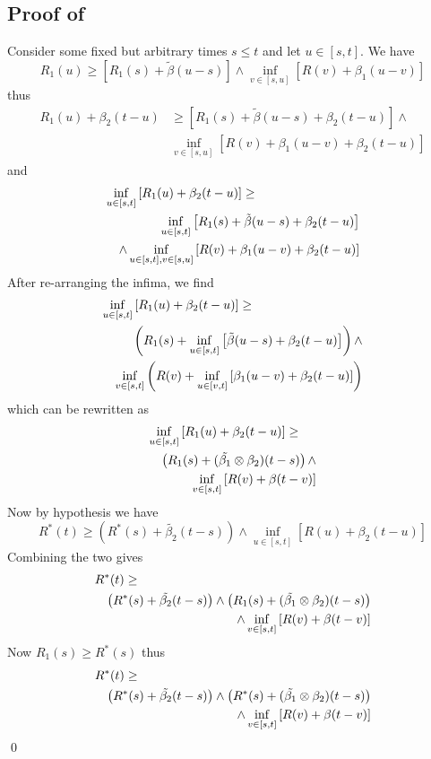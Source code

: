 \subsection{Proof of }
 Consider some fixed but arbitrary times $s\leq t$ and let $u
 \in [s,t]$. We have
 $$
 R_1(u) \geq \left[R_1(s) + \tilde{\beta}(u-s) \right]
 \wedge
 \inf_{v \in [s,u]} \left[ R(v) + \beta_1(u-v)\right]
 $$
 thus
 $$
  \begin{array}{rl}
   R_1(u)  + \beta_2(t-u) &\geq
    \left[R_1(s) + \tilde{\beta}(u-s)+\beta_2(t-u)
 \right]
 \wedge \\
 &\inf_{v \in [s,u]} \left[ R(v) + \beta_1(u-v)
 +\beta_2(t-u)\right]
  \end{array}
 $$
 and
 \begin{eqnarray*}
  \lefteqn{\inf_{u \in [s,t]} \left[R_1(u) + \beta_2(t-u)\right]
  \geq  } \\
  & & \inf_{u \in [s,t]}
 \left[R_1(s) + \tilde{\beta}(u-s)+\beta_2(t-u) \right]\\
  & &
 \wedge
 \inf_{u \in [s,t], v \in [s,u]}
 \left[ R(v) + \beta_1(u-v) +\beta_2(t-u)\right]
 \end{eqnarray*}
 After re-arranging the infima, we find
 \begin{eqnarray*}
  \lefteqn{
 \inf_{u \in [s,t]} \left[R_1(u) + \beta_2(t-u)\right]
 \geq } \\
 & &   \left(R_1(s) +
  \inf_{u \in [s,t]} \left[\tilde{\beta}(u-s)+\beta_2(t-u)
  \right]\right)
 \wedge \\
& & \inf_{v \in [s,t]}\left( R(v) + \inf_{u \in [v,t]} \left[
\beta_1(u-v) +\beta_2(t-u)\right]\right)
\end{eqnarray*}
which can be rewritten as
 \begin{eqnarray*}
  \lefteqn{\inf_{u \in [s,t]} \left[R_1(u) + \beta_2(t-u)\right]
  \geq}\\
 & &  \left( R_1(s) + (\tilde{\beta_1} \mpc \beta_2) (t-s)
 \right) \wedge\\
 & & \inf_{v \in [s,t]}\left[R(v) + \beta(t-v)\right]
\end{eqnarray*}
Now by hypothesis we have
$$
R^*(t) \geq \left( R^*(s) + \tilde{\beta_2}(t-s)\right) \wedge
\inf_{u \in [s,t]}[R(u)+\beta_2(t-u)]
$$
Combining the two gives
\begin{eqnarray*}
  \lefteqn{
R^*(t) \geq }\\
 & & \left( R^*(s) + \tilde{\beta_2}(t-s)\right) \wedge
\left( R_1(s) + (\tilde{\beta_1} \mpc \beta_2) (t-s) \right)\\
 & & \wedge
 \inf_{v \in [s,t]}\left[R(v) + \beta(t-v)\right]
\end{eqnarray*}
Now $R_1(s) \geq R^*(s)$ thus
\begin{eqnarray*}
  \lefteqn{
R^*(t) \geq }\\ & & \left( R^*(s) +
\tilde{\beta_2}(t-s)\right) \wedge\left( R^*(s) +
(\tilde{\beta_1} \mpc \beta_2) (t-s)\right)\\
 & & \wedge
 \inf_{v \in [s,t]}\left[R(v) + \beta(t-v)\right]
\end{eqnarray*}
 \qed

